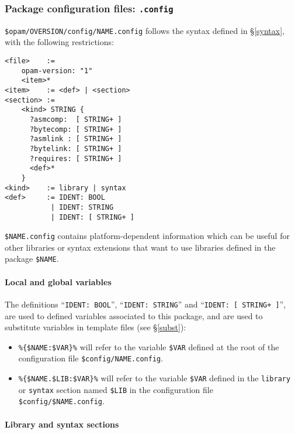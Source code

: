 \documentclass[a4paper,11pt]{article}
\begin{document}
\subsubsection{Package configuration files: {\tt .config}}
\label{dotconfig}

\verb+$opam/OVERSION/config/NAME.config+ follows the syntax defined in
\S\ref{syntax}, with the following restrictions:

{\small
\begin{Verbatim}[frame=single]
<file>    :=
    opam-version: "1"
    <item>*
<item>    := <def> | <section>
<section> :=
    <kind> STRING {
      ?asmcomp:  [ STRING+ ]
      ?bytecomp: [ STRING+ ]
      ?asmlink : [ STRING+ ]
      ?bytelink: [ STRING+ ]
      ?requires: [ STRING+ ]
      <def>*
    }
<kind>    := library | syntax
<def>     := IDENT: BOOL
           | IDENT: STRING
           | IDENT: [ STRING+ ]
\end{Verbatim}
}

\verb+$NAME.config+ contains platform-dependent information which can
be useful for other libraries or syntax extensions that want to use
libraries defined in the package \verb+$NAME+.

\paragraph{Local and global variables}

The definitions ``{\tt IDENT: BOOL}'', ``{\tt IDENT: STRING}'' and ``{\tt IDENT:
  [ STRING+ ]}'', are used to defined variables associated to this
package, and are used to substitute variables in template files (see
\S\ref{subst}):

\begin{itemize}

\item \verb+%{$NAME:$VAR}%+ will refer to the variable \verb+$VAR+
  defined at the root of the configuration file \verb+$config/NAME.config+.

\item \verb+%{$NAME.$LIB:$VAR}%+ will refer to the variable \verb+$VAR+
  defined in the {\tt library} or {\tt syntax} section named
  \verb+$LIB+ in the configuration file \verb+$config/$NAME.config+.

\end{itemize}

\paragraph{Library and syntax sections}
\end{document}
